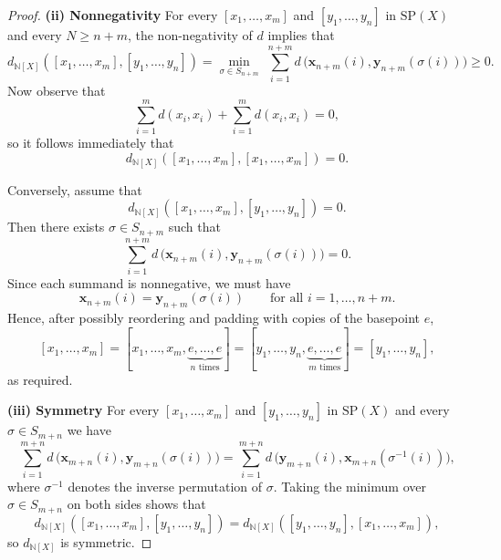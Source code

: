 \documentclass[10pt,a4paper]{article}
\theoremstyle{definition}
\newcommand{\SP}{\mathrm{SP}}
\newcommand{\N}{\mathbb{N}}
\begin{document}
\begin{proof}
    \noindent\textbf{(ii) Nonnegativity} 
    For every $[x_1,\dots,x_m]$ and $[y_1,\ldots,y_n]$ in $\SP(X)$ and every $N \geq n + m$, the non-negativity of $d$ implies that 
    \[
    d_{\N[X]}([x_1,\dots,x_m],[y_1,\dots,y_n])
    = \min_{\sigma \in S_{n+m}}\;
    \sum_{i=1}^{n+m} d\,\bigl(\mathbf{x}_{n+m}(i), \mathbf{y}_{n+m}(\sigma(i))\bigr) \geq 0.
    \]
    Now observe that
    \[
    \sum_{i=1}^{m} d(x_i,x_i) + \sum_{i=1}^{m} d(x_i,x_i) = 0,
    \]
    so it follows immediately that
    \[
    d_{\N[X]}([x_1,\dots,x_m],[x_1,\dots,x_m]) = 0.
    \]
    
    Conversely, assume that
    \[
    d_{\N[X]}([x_1,\dots,x_m],[y_1,\dots,y_n]) = 0.
    \]
    Then there exists $\sigma \in S_{n+m}$ such that
    \[
    \sum_{i=1}^{n+m} d\,\bigl(\mathbf{x}_{n+m}(i),\mathbf{y}_{n+m}(\sigma(i))\bigr) = 0.
    \]
    Since each summand is nonnegative, we must have
    \[
    \mathbf{x}_{n+m}(i) = \mathbf{y}_{n+m}(\sigma(i))
    \qquad \text{for all } i=1,\dots,n+m.
    \]
    Hence, after possibly reordering and padding with copies of the basepoint $e$,
    \[
    [x_1,\dots,x_m]
    = [x_1,\dots,x_m,\underbrace{e,\dots,e}_{n \text{ times}}]
    = [y_1,\dots,y_n,\underbrace{e,\dots,e}_{m \text{ times}}]
    = [y_1,\dots,y_n],
    \]
    as required.

    
    \noindent\textbf{(iii) Symmetry}
        For every $[x_1,\dots,x_m]$ and $[y_1,\ldots,y_n]$ in $\SP(X)$ and every $\sigma \in S_{m+n}$ we have
    \[
    \sum_{i=1}^{m+n} d\,\bigl(\mathbf{x}_{m+n}(i),\mathbf{y}_{m+n}(\sigma(i))\bigr)
    = 
    \sum_{i=1}^{m+n} d\,\bigl(\mathbf{y}_{m+n}(i),\mathbf{x}_{m+n}(\sigma^{-1}(i))\bigr),
    \]
    where $\sigma^{-1}$ denotes the inverse permutation of $\sigma$.
    Taking the minimum over $\sigma \in S_{m+n}$ on both sides shows that
    \[
    d_{\N[X]}([x_1,\dots,x_m],[y_1,\dots,y_n])
    =
    d_{\N[X]}([y_1,\dots,y_n],[x_1,\dots,x_m]),
    \]
    so $d_{\N[X]}$ is symmetric.


\end{proof}
\end{document}
